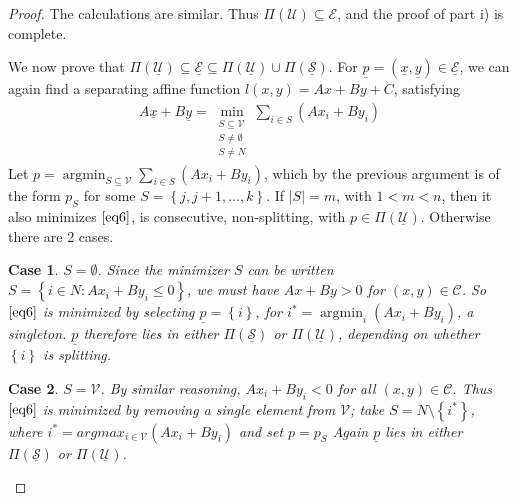 \documentclass{article}
\theoremstyle{case}
\newtheorem{case}{Case}
\DeclareMathOperator*{\argmin}{argmin} %
\begin{document}
\begin{proof}
The calculations are similar. Thus $\Pi \left( \mathcal{U}\right) \subseteq \mathcal{E}$, and the proof of part i) is complete.

We now prove that $\Pi\left( \mathcal{\underline{U}}\right) \subseteq \underline{\mathcal{E}} \subseteq \Pi\left( \mathcal{\underline{U}}\right) \cup \Pi\left( \mathcal{\underline{S}}\right)$. For $\underline{p} = \left( \underline{x}, \underline{y} \right) \in \underline{\mathcal{E}}$, we can again find a separating affine function $l\left( x,y\right) = Ax + By + C$, satisfying
\begin{align} \label{eq6}
A\underline{x} + B\underline{y} =\min_{\substack{S \subseteq \mathcal{V} \\ S \neq \emptyset \\ S \neq N}} \sum_{i \in S} \left( Ax_i + By_i\right)
\end{align}
Let $p = \argmin_{S \subseteq \mathcal{V}} \sum_{i \in S} \left( Ax_i + By_i\right)$, which by the previous argument is of the form $p_S$ for some $S = \left\lbrace j, j+1, \dots, k\right\rbrace$. If $\vert S \vert = m$, with $1 < m < n$, then it also minimizes $\ref{eq6}$, is consecutive, non-splitting, with $p \in \Pi\left( \mathcal{\underline{U}}\right)$. Otherwise there are 2 cases.

\setcounter{case}{0}
\begin{case} $S = \emptyset$. 
Since the minimizer $S$ can be written $S = \left\lbrace i \in N \colon Ax_i + By_i \leq 0 \right\rbrace$, we must have $Ax + By > 0$ for $\left( x,y\right) \in \mathcal{C}$. So $\ref{eq6}$ is minimized by selecting $\underline{p} = \left\lbrace i\right\rbrace$, for $i^* = \argmin_i \left( Ax_i + By_i\right)$, a singleton. $\underline{p}$ therefore lies in either $\Pi\left( \underline{\mathcal{S}}\right)$ or $\Pi\left( \mathcal{\underline{U}}\right)$, depending on whether $\left\lbrace i\right\rbrace$ is splitting.
\end{case}

\begin{case} $S = \mathcal{V}$. By similar reasoning, $Ax_i + By_i < 0$ for all $\left( x,y\right) \in \mathcal{C}$. Thus $\ref{eq6}$ is minimized by removing a single element from $\mathcal{V}$; take $S = N\setminus \left\lbrace i^*\right\rbrace$, where $i^* = argmax_{i \in \mathcal{V}} \left( Ax_i + By_i\right)$ and set $p = p_S$ Again $\underline{p}$ lies in either $\Pi\left( \underline{\mathcal{S}}\right)$ or $\Pi\left( \mathcal{\underline{U}}\right)$.
\end{case}


\end{proof}
\end{document}
